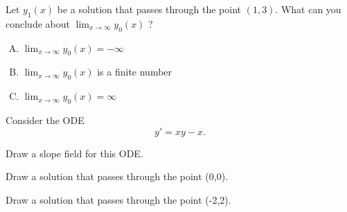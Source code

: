 \begin{applicationActivities}
\begin{definition}
\end{definition}

\begin{activity}{5}
\begin{center}\end{center}

Let \(y_1(x)\) be a solution that passes through the point \( (1,3) \).  What can you conclude about \( \lim _{x \rightarrow \infty} y_0(x) \) ?
\begin{enumerate}[(A)]
\item \( \lim _{x \rightarrow \infty} y_0(x) = -\infty \) 
\item \( \lim _{x \rightarrow \infty} y_0(x) \) is a finite number
\item \( \lim _{x \rightarrow \infty} y_0(x) = \infty \) 
\end{enumerate}

\end{activity}

\begin{activity}{15}
Consider the ODE \[y'=xy-x.\]
\begin{subactivity}
Draw a slope field for this ODE.
\end{subactivity}
\begin{subactivity}
Draw a solution that passes through the point (0,0).
\end{subactivity}
\begin{subactivity}
Draw a solution that passes through the point (-2,2).
\end{subactivity}
\end{activity}


\end{applicationActivities}
